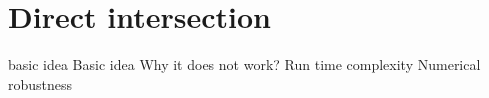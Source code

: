 
\chapter{Direct intersection}
basic idea
Basic idea
Why it does not work?
Run time complexity
Numerical robustness
